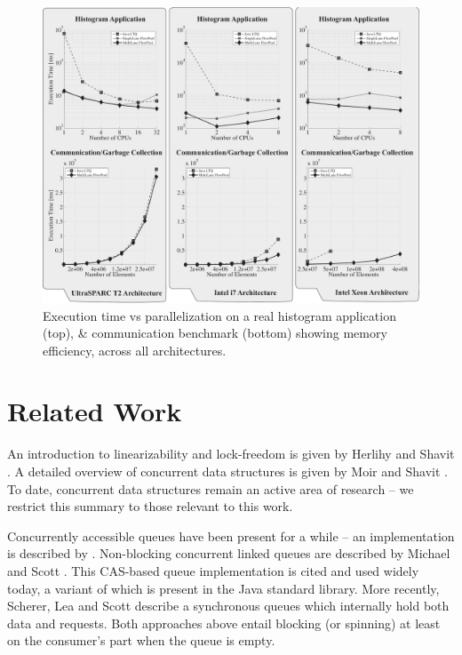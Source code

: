 \documentclass[runningheads,a4paper]{llncs}
\begin{document}
\begin{figure}[ht!]
\centering
\includegraphics[width=\textwidth]{../benchmarks/graphs/hist-comm}
\setlength{\abovecaptionskip}{-10pt}
\setlength{\belowcaptionskip}{-20pt}
\caption{Execution time vs parallelization on a real histogram application
(top), \& communication benchmark (bottom) showing memory efficiency, 
across all architectures.}
\label{fig:eval-hist-comm}
\end{figure}


\section{Related Work}

An introduction to linearizability and lock-freedom 
is given by Herlihy and Shavit \cite{Herlihy08}.
A detailed overview of concurrent data structures is given
by Moir and Shavit \cite{Moir05}.
To date, concurrent data structures remain an active area of
research -- we restrict this summary to those relevant to this work.

Concurrently accessible queues have been present for a while --
an implementation is described by \cite{Mellor87}.
Non-blocking concurrent linked queues are described by Michael and
Scott \cite{Michael96}. This CAS-based
queue implementation is cited and used widely today, a variant of
which is present in the Java standard library.
More recently, Scherer, Lea and Scott \cite{SchererLS09} describe a
synchronous queues which internally hold both data and requests.
Both approaches above entail blocking (or spinning) at least on the
consumer's part when the queue is empty.
\end{document}
